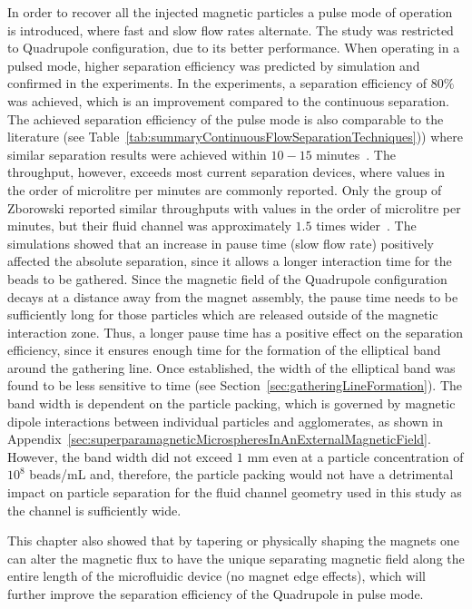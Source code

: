 In order to recover all the injected magnetic particles a pulse mode of operation is introduced, where fast and slow flow rates alternate. The study was restricted to Quadrupole configuration, due to its better performance. When operating in a pulsed mode, higher separation efficiency was predicted by simulation and confirmed in the experiments. In the experiments, a separation efficiency of $80\%$ was achieved, which is an improvement compared to the continuous separation. The achieved separation efficiency of the pulse mode is also comparable to the literature (see Table~\ref{tab:summaryContinuousFlowSeparationTechniques})) where similar separation results were achieved within $10-15$ minutes~\cite{Kim2013,Park2015}. The throughput, however, exceeds most current separation devices, where values in the order of microlitre per minutes are commonly reported. Only the group of Zborowski \etal{} reported similar throughputs with values in the order of microlitre per minutes, but their fluid channel was approximately $1.5$ times wider~\cite{Zborowski2011a}. The simulations showed that an increase in pause time (slow flow rate) positively affected the absolute separation, since it allows a longer interaction time for the beads to be gathered. Since the magnetic field of the Quadrupole configuration decays at a distance away from the magnet assembly, the pause time needs to be sufficiently long for those particles which are released outside of the magnetic interaction zone. Thus, a longer pause time has a positive effect on the separation efficiency, since it ensures enough time for the formation of the elliptical band around the gathering line. Once established, the width of the elliptical band was found to be less sensitive to time (see Section~\ref{sec:gatheringLineFormation}). The band width is dependent on the particle packing, which is governed by magnetic dipole interactions between individual particles and agglomerates, as shown in Appendix~\ref{sec:superparamagneticMicrospheresInAnExternalMagneticField}. However, the band width did not exceed $1$ mm even at a particle concentration of $10^8$ beads/mL and, therefore, the particle packing would not have a detrimental impact on particle separation for the fluid channel geometry used in this study as the channel is sufficiently wide.

This chapter also showed that by tapering or physically shaping the magnets one can alter the magnetic flux to have the unique separating magnetic field along the entire length of the microfluidic device (no magnet edge effects), which will further improve the separation efficiency of the Quadrupole in pulse mode.  

